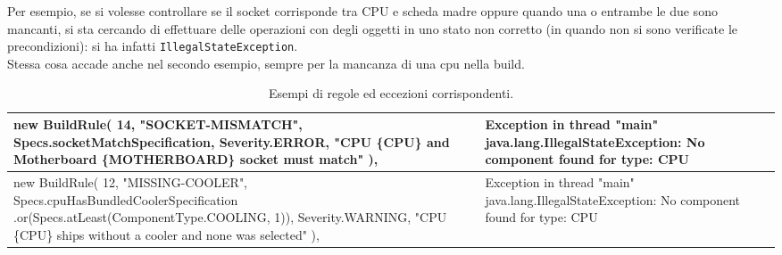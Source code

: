 \documentclass[12pt,a4paper]{article}
\begin{document}
Per esempio, se si volesse controllare se il socket corrisponde tra CPU e scheda madre oppure quando una o entrambe le due sono mancanti, si sta cercando di effettuare delle operazioni con degli oggetti in uno stato non corretto (in quando non si sono verificate le precondizioni): si ha infatti \texttt{IllegalStateException}.\\
Stessa cosa accade anche nel secondo esempio, sempre per la mancanza di una cpu nella build.
\begin{table}
    \centering
    \footnotesize
    \begin{tabularx}{\textwidth}{|X|X|}
    \hline
    \ttfamily
    new BuildRule(\newline
    \hspace*{2em}14,\newline
    \hspace*{2em}"SOCKET-MISMATCH",\newline
    \hspace*{2em}Specs.socketMatchSpecification,\newline
    \hspace*{2em}Severity.ERROR,\newline
    \hspace*{2em}"CPU \{CPU\} and Motherboard \{MOTHERBOARD\} socket must match"\newline
    ), & 
    \ttfamily\color{red!80!black}
    Exception in thread "main" java.lang.IllegalStateException: No component found for type: CPU \\
    \hline
    \ttfamily
    new BuildRule(\newline
    \hspace*{2em}12,\newline
    \hspace*{2em}"MISSING-COOLER",\newline
    \hspace*{2em}Specs.cpuHasBundledCoolerSpecification
    \hspace*{2em}.or(Specs.atLeast(ComponentType.COOLING, 1)),\newline
    \hspace*{2em}Severity.WARNING,\newline
    \hspace*{2em}"CPU \{CPU\} ships without a cooler and none was selected"\newline
    ), & 
    \ttfamily\color{red!80!black}
    Exception in thread "main" java.lang.IllegalStateException: No component found for type: CPU \\
    \hline
    \end{tabularx}
    \caption{Esempi di regole ed eccezioni corrispondenti.}
    \label{tab:buildrule_exception}
\end{table}
\end{document}
